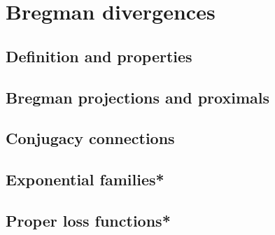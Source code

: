 \chapter{Bregman divergences}

\section{Definition and properties}

\section{Bregman projections and proximals}

\section{Conjugacy connections}

\section{Exponential families*}

\section{Proper loss functions*}